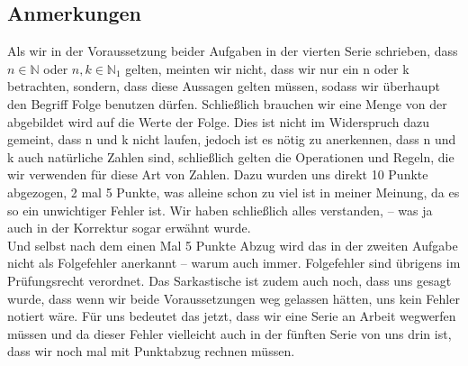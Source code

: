 \documentclass[12pt, a4paper]{article}
\begin{document}
\subsection*{Anmerkungen}
\begin{singlespace}
    Als wir in der Voraussetzung beider Aufgaben in der vierten Serie schrieben, dass \(n \in \mathbb N\) oder \(n,k \in \mathbb N_1\) gelten, meinten wir nicht, dass wir nur ein n oder k betrachten, sondern, dass diese Aussagen gelten müssen, sodass wir überhaupt den Begriff Folge benutzen dürfen. Schließlich brauchen wir eine Menge von der abgebildet wird auf die Werte der Folge. Dies ist nicht im Widerspruch dazu gemeint, dass n und k nicht laufen, jedoch ist es nötig zu anerkennen, dass n und k auch natürliche Zahlen sind, schließlich gelten die Operationen und Regeln, die wir verwenden für diese Art von Zahlen. Dazu wurden uns direkt 10 Punkte abgezogen, 2 mal 5 Punkte, was alleine schon zu viel ist in meiner Meinung, da es so ein unwichtiger Fehler ist. Wir haben schließlich alles verstanden, -- was ja auch in der Korrektur sogar erwähnt wurde.\\
    Und selbst nach dem einen Mal 5 Punkte Abzug wird das in der zweiten Aufgabe nicht als Folgefehler anerkannt -- warum auch immer. Folgefehler sind übrigens im Prüfungsrecht verordnet. Das Sarkastische ist zudem auch noch, dass uns gesagt wurde, dass wenn wir beide Voraussetzungen weg gelassen hätten, uns kein Fehler notiert wäre. Für uns bedeutet das jetzt, dass wir eine Serie an Arbeit wegwerfen müssen und da dieser Fehler vielleicht auch in der fünften Serie von uns drin ist, dass wir noch mal mit Punktabzug rechnen müssen.    
\end{singlespace}
\end{document}
